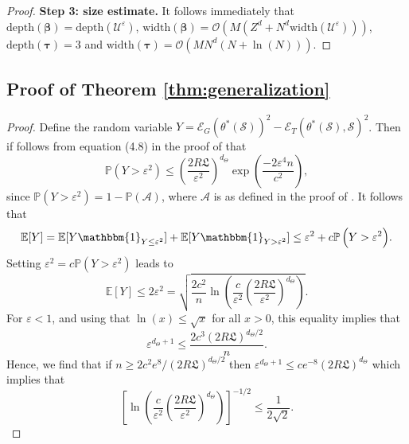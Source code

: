 \documentclass{article}
\numberwithin{equation}{section}
\newcommand{\width}{\mathrm{width}}
\newcommand{\depth}{\mathrm{depth}}
\renewcommand{\S}{\mathscr{S}}
\newcommand{\cA}{\mathcal{A}}
\newcommand{\cU}{\mathcal{U}}
\newcommand{\trunk}{{\bm{\tau}}}
\newcommand{\branch}{{\bm{\beta}}}
\renewcommand{\epsilon}{\varepsilon}
\newcommand{\1}{\mathbbm{1}}
\renewcommand{\S}{\mathcal{S}} %
\newcommand{\Et}{\mathcal{E}_T} %
\newcommand{\Eg}{\mathcal{E}_G} %
\newcommand{\bigO}{\mathcal{O}}
\newcommand{\Prob}[1]{{\mathbb{P}\left( #1 \right)}} %
\begin{document}
\begin{proof}
\textbf{Step 3: size estimate.} It follows immediately that $\depth(\branch)=\depth(\cU^\epsilon)$, $\width(\branch) = \bigO(M(Z^d+N^d\width(\cU^\epsilon)))$, 
$\depth(\trunk) = 3$ and $\width(\trunk) = \bigO(MN^d(N+\ln(N)))$. 

\end{proof}

\subsection{Proof of Theorem \ref{thm:generalization}}\label{app:generalization}

\begin{proof}
Define the random variable $Y = \Eg(\theta^*(\S))^2-\Et(\theta^*(\S),\S)^2$.
Then if follows from equation (4.8) in the proof of \cite[Theorem 5]{deryck2021pinn} that 
\begin{equation}
    \mathbb{P}(Y > \epsilon^2) \leq \left(\frac{2R\mathfrak{L}}{\epsilon^2}\right)^{d_\Theta} \exp\left(\frac{-2\epsilon^4n}{c^2}\right),
\end{equation}
since $\mathbb{P}(Y > \epsilon^2) = 1 - \Prob{\cA}$, where $\cA$ is as defined in the proof of \cite[Theorem 5]{deryck2021pinn}. It follows that
\begin{equation}\label{eq:EY}
\begin{split}
    \mathbb{E}[Y] = \mathbb{E}[Y \mathbbm{1}_{Y\leq \epsilon^2}] + \mathbb{E}[Y \mathbbm{1}_{Y> \epsilon^2}] \leq \epsilon^2 + c \Prob{Y> \epsilon^2}. 
\end{split}
\end{equation}
Setting $\epsilon^2 = c \Prob{Y> \epsilon^2}$ leads to
\begin{equation}
    \mathbb{E}[Y] \leq 2\epsilon^2 = \sqrt{\frac{2c^2}{n}\ln(\frac{c}{\epsilon^2}\left(\frac{2R\mathfrak{L}}{\epsilon^2}\right)^{d_\Theta})}. 
\end{equation}
For $\epsilon<1$, and using that $\ln(x)\leq \sqrt{x}$ for all $x>0$, this equality implies that 
\begin{equation}
    \epsilon^{{d_\Theta}+1} \leq \frac{2c^3(2R\mathfrak{L})^{{d_\Theta}/2}}{n}. 
\end{equation}
Hence, we find that if $n\geq 2c^2e^8/(2R\mathfrak{L})^{{d_\Theta}/2}$ then $\epsilon^{{d_\Theta}+1}\leq ce^{-8}(2R\mathfrak{L})^{d_\Theta}$ which implies that 
\begin{equation}\label{eq:2sqrt2}
    \left[\ln(\frac{c}{\epsilon^2}\left(\frac{2R\mathfrak{L}}{\epsilon^2}\right)^{d_\Theta})\right]^{-1/2} \leq \frac{1}{2\sqrt{2}}. 

\end{equation}
\end{proof}
\end{document}

